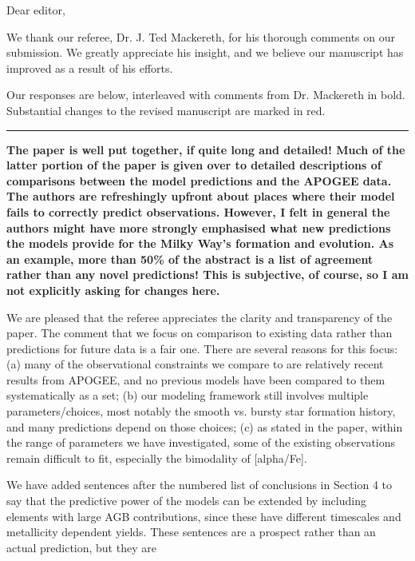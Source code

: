 \documentclass{report}
\newcommand{\breakline}{\noindent\rule{\textwidth}{1pt}}
\begin{document}
 
Dear editor, 
\par\null\par 
We thank our referee, Dr. J. Ted Mackereth, for his thorough comments on our 
submission. 
We greatly appreciate his insight, and we believe our manuscript 
has improved as a result of his efforts. 
\par
Our responses are below, interleaved with comments from Dr. Mackereth in 
bold. 
Substantial changes to the revised manuscript are marked in red. 

\par\null\par 
\breakline 
\par\null\par 
\textbf{
	The paper is well put together, if quite long and detailed! 
	Much of the latter portion of the paper is given over to detailed 
	descriptions of comparisons between the model predictions and the APOGEE 
	data. 
	The authors are refreshingly upfront about places where their model fails 
	to correctly predict observations. 
	However, I felt in general the authors might have more strongly emphasised 
	what new predictions the models provide for the Milky Way's formation and 
	evolution. 
	As an example, more than 50\% of the abstract is a list of agreement rather 
	than any novel predictions! 
	This is subjective, of course, so I am not explicitly asking for changes 
	here.
} 
\par 
We are pleased that the referee appreciates the clarity and transparency of
the paper. 
The comment that we focus on comparison to existing data rather than 
predictions for future data is a fair one. 
There are several reasons for this focus: 
(a) many of the observational constraints we compare to are relatively recent 
results from APOGEE, and no previous models have been compared to them 
systematically as a set; 
(b) our modeling framework still involves multiple parameters/choices, most 
notably the smooth vs. bursty star formation history, and many predictions 
depend on those choices; 
(c) as stated in the paper, within the range of parameters we have 
investigated, some of the existing observations remain difficult to fit, 
especially the bimodality of [alpha/Fe]. 
\par 
We have added sentences after the numbered list of conclusions in Section 4 
to say that the predictive power of the models can be extended by including 
elements with large AGB contributions, since these have different timescales 
and metallicity dependent yields. 
These sentences are a prospect rather than an actual prediction, but they are 
\end{document}
